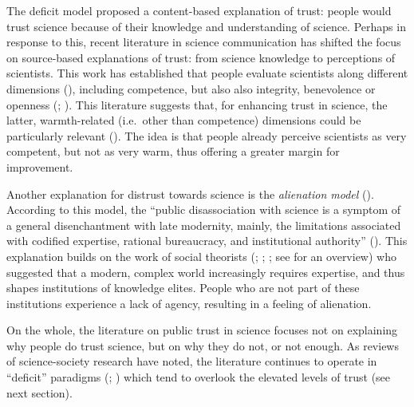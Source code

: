 \documentclass[
  jou,
  floatsintext,
  longtable,
  nolmodern,
  notxfonts,
  notimes,
  colorlinks=true,linkcolor=blue,citecolor=blue,urlcolor=blue]{apa7}
\begin{document}
The deficit model proposed a content-based explanation of trust: people
would trust science because of their knowledge and understanding of
science. Perhaps in response to this, recent literature in science
communication has shifted the focus on source-based explanations of
trust: from science knowledge to perceptions of scientists. This work
has established that people evaluate scientists along different
dimensions
(),
including competence, but also also integrity, benevolence or openness
(; ). This literature suggests that, for enhancing trust in
science, the latter, warmth-related (i.e.~other than competence)
dimensions could be particularly relevant
(). The
idea is that people already perceive scientists as very competent, but
not as very warm, thus offering a greater margin for improvement.

Another explanation for distrust towards science is the \emph{alienation
model} (). According to this model, the ``public disassociation with
science is a symptom of a general disenchantment with late modernity,
mainly, the limitations associated with codified expertise, rational
bureaucracy, and institutional authority''
(). This explanation builds on the work of social theorists
(;
;
; see
 for an
overview) who suggested that a modern, complex world increasingly
requires expertise, and thus shapes institutions of knowledge elites.
People who are not part of these institutions experience a lack of
agency, resulting in a feeling of alienation.

On the whole, the literature on public trust in science focuses not on
explaining why people do trust science, but on why they do not, or not
enough. As reviews of science-society research have noted, the
literature continues to operate in ``deficit'' paradigms
(;
) which
tend to overlook the elevated levels of trust (see next section).
\end{document}
